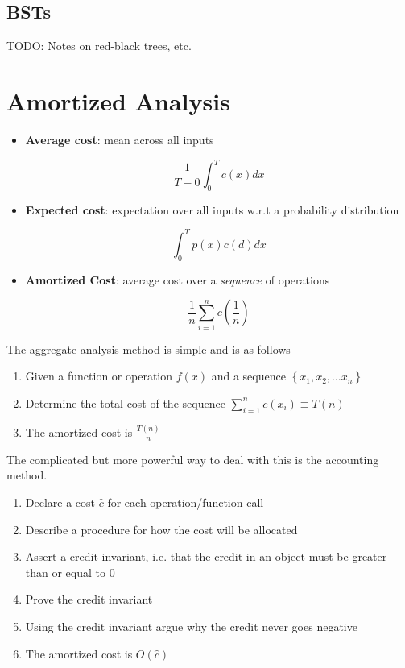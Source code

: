 \documentclass[../notes.tex]{subfiles}
\begin{document}
\subsection{BSTs}
TODO: Notes on red-black trees, etc.


\section{Amortized Analysis}
\begin{definition}

	\begin{itemize}
		\item \textbf{Average cost}: mean across all inputs

			\begin{equation}
				\frac{1}{T-0} \int_{0}^{T} c(x) dx 
			\end{equation}
			
		\item \textbf{Expected cost}: expectation over all inputs w.r.t a probability distribution

			\begin{equation}
				\int_{0}^{T}   p(x) c(d) dx
			\end{equation}
			
		\item \textbf{Amortized Cost}: average cost over a \textit{sequence} of operations

			\begin{equation}
				\frac{1}{n} \sum_{i=1}^{n} c(\frac{1}{n})
			\end{equation}
	\end{itemize}

\end{definition}

The aggregate analysis method is simple and is as follows

\begin{enumerate}
	\item Given a function or operation $ f(x) $ and a sequence $ \left\{ x_1, x_2, \ldots x_n \right\}  $
	\item Determine the total cost of the sequence $ \sum_{i=1}^{n} c(x_i) \equiv T(n) $
	\item The amortized cost is $ \frac{T(n)}{n} $
\end{enumerate}

The complicated but more powerful way to deal with this is the accounting method.


\begin{enumerate}
	\item Declare a cost $ \hat{c} $ for each operation/function call
	\item Describe a procedure for how the cost will be allocated
	\item Assert a credit invariant, i.e. that the credit in an object must be greater than or equal to 0
	\item Prove the credit invariant
	\item Using the credit invariant argue why the credit never goes negative
	\item The amortized cost is $ O(\hat{c}) $
\end{enumerate}
\end{document}
